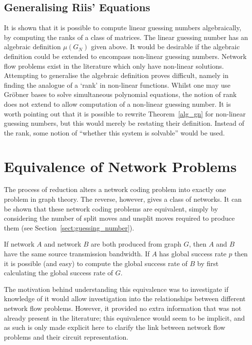 \subsection{Generalising Riis' Equations}

It is shown that it is possible to compute linear guessing numbers algebraically, by computing the ranks of a class of matrices. The linear guessing number has an algebraic definition $\mu(G_N)$ given above. It would be desirable if the algebraic definition could be extended to encompass non-linear guessing numbers. Network flow problems exist in the literature \cite{doug2005, riis2004} which only have non-linear solutions. Attempting to generalise the algebraic definition proves difficult, namely in finding the analogue of a `rank' in non-linear functions. Whilst one may use Gr\"obner bases to solve simultaneous polynomial equations, the notion of rank does not extend to allow computation of a non-linear guessing number. It is worth pointing out that it is possible to rewrite Theorem~\ref{alg_gn} for non-linear guessing numbers, but this would merely be restating their definition. Instead of the rank, some notion of ``whether this system is solvable'' would be used.

\section{Equivalence of Network Problems}

The process of reduction alters a network coding problem into exactly one problem in graph theory. The reverse, however, gives a class of networks. It can be shown that these network coding problems are equivalent, simply by considering the number of split moves and unsplit moves required to produce them (see Section~\ref{sect:guessing_number}).

If network $A$ and network $B$ are both produced from graph $G$, then $A$ and $B$ have the same source transmission bandwidth. If $A$ has global success rate $p$ then it is possible (and easy) to compute the global success rate of $B$ by first calculating the global success rate of $G$.

The motivation behind understanding this equivalence was to investigate if knowledge of it would allow investigation into the relationships between different network flow problems. However, it provided no extra information that was not already present in the literature; this equivalence would seem to be implicit, and as such is only made explicit here to clarify the link between network flow problems and their circuit representation.

